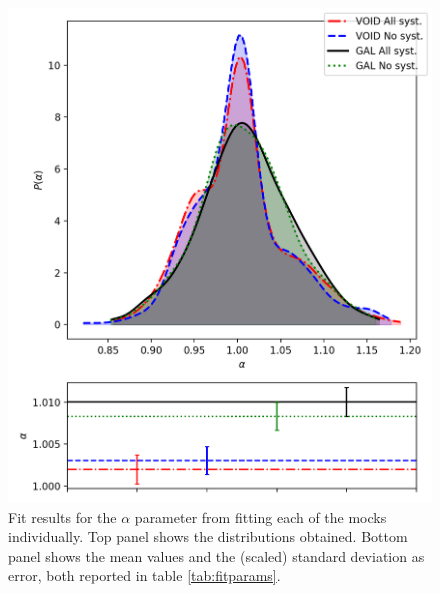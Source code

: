 \documentclass[fleqn, usenatbib]{mnras}
\begin{document}
\begin{figure}
	\centering
	\includegraphics[width=1\linewidth]{plots/alpha_comparison_ALLvsNO}
	\caption{Fit results for the $\alpha$ parameter from fitting each of the mocks individually. Top panel shows the distributions obtained. Bottom panel shows the mean values and the (scaled) standard deviation as error, both reported in table \ref{tab:fitparams}.}
	\label{fig:alphacomparisonallvsno}
\end{figure}
\end{document}
